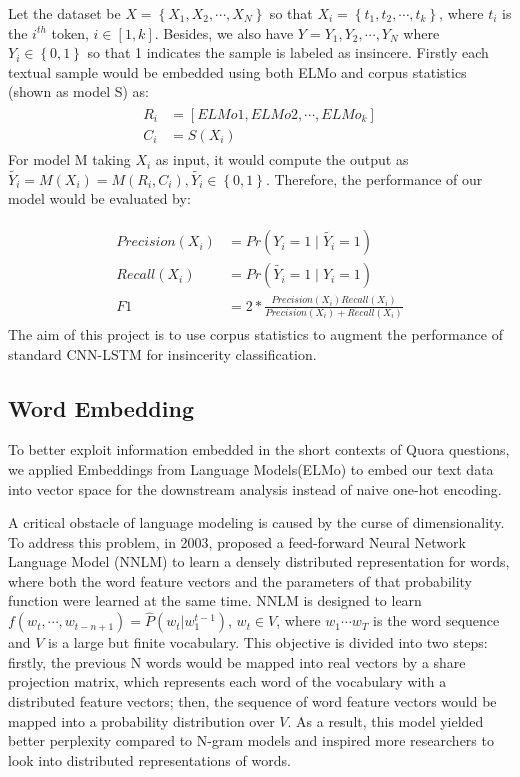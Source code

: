 \documentclass[12pt]{diazessay} %
\begin{document}
Let the dataset be $X = \left \{ X_1, X_2,\cdots, X_N \right \}$ so that $X_i = \left \{ t_1, t_2,\cdots, t_k \right \}$, where $t_i$ is the $i^{th}$ token, $i\in [1,k]$. Besides, we also have $Y={Y_1, Y_2,\cdots,Y_N}$ where $Y_i\in\left\{ 0, 1 \right\}$ so that 1 indicates the sample is labeled as  insincere. Firstly each textual sample would be embedded using both ELMo and corpus statistics (shown as model S) as:
\begin{align} 
\begin{split}
   R_i &= [ELMo1, ELMo2,\cdots,ELMo_k]\\
   C_i &= S(X_i)
\end{split}         
\end{align}
For model M taking $X_i$ as input, it would compute the output as $\widetilde{Y_i} = M(X_i) = M(R_i, C_i), \widetilde{Y_i} \in \left\{ 0, 1 \right\}$. Therefore, the performance of our model would be evaluated by:

\begin{align} 
\begin{split}
   Precision(X_i) &= Pr(Y_i=1 \mid \widetilde{Y_i}=1) \\
   Recall(X_i) &= Pr(\widetilde{Y_i}=1 \mid Y_i=1) \\ 
   F1 & = 2 * \frac{Precision(X_i) Recall(X_i)}{Precision(X_i) + Recall(X_i)}
\end{split}         
\end{align}
The aim of this project is to use corpus statistics to augment the performance of standard CNN-LSTM for insincerity classification.


\subsection{Word Embedding}

To better exploit information embedded in the short contexts of Quora questions, we applied Embeddings from Language Models(ELMo) to embed our text data into vector space for the downstream analysis instead of naive one-hot encoding.

A critical obstacle of language modeling is caused by the curse of dimensionality. To address this problem, in 2003, \citet{bengio2003neural} proposed a feed-forward Neural Network Language Model (NNLM) to learn a densely distributed representation\citep{hinton1986learning} for words, where both the word feature vectors and the parameters of that probability function were learned at the same time. NNLM is designed to learn $f \left( w _ { t } , \cdots , w _ { t - n + 1 } \right) = \hat { P } \left( w _ { t } | w _ { 1 } ^ { t - 1 } \right)$, $w _ { t } \in V$, where $w_1 \cdots w_T$ is the word sequence and $V$ is a large but finite vocabulary. This objective is divided into two steps: firstly, the previous N words would be mapped into real vectors by a share projection matrix, which represents each word of the vocabulary with a distributed feature vectors; then, the sequence of word feature vectors would be mapped into a probability distribution over $V$. As a result, this model yielded better perplexity compared to N-gram models and inspired more researchers to look into distributed representations of words.
\end{document}
